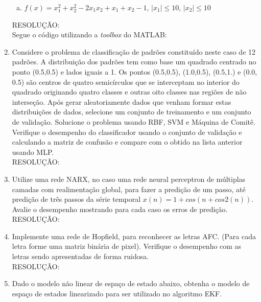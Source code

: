 \documentclass[a4paper,oneside,12pt]{article}
\begin{document}
\begin{enumerate}[1.]
\begin{enumerate}[a)]
\item $f(x) = x_{1}^{2} + x_{2}^{2} - 2 x_{1} x_{2} + x_{1} + x_{2} - 1$, $|x_{1}| \leq 10$, $|x_{2}| \leq 10$
\end{enumerate}

RESOLU\c{C}\~AO: \\

Segue o c\'odigo utilizando a \emph{toolbox} do MATLAB:



\item Considere o problema de classifica\c{c}\~ao de padr\~oes constitu\'ido neste caso de 12 padr\~oes. A distribui\c{c}\~ao dos padr\~oes tem como base um quadrado centrado no ponto (0.5,0.5) e lados iguais a 1. Os pontos (0.5,0.5), (1.0,0.5), (0.5,1.) e (0.0, 0.5) s\~ao centros de quatro semic\'irculos que se interceptam no interior do quadrado originando quatro classes e outras oito classes nas regi\~oes de n\~ao interse\c{c}\~ao. Ap\'os gerar aleatoriamente dados que venham formar estas distribui\c{c}\~oes de dados, selecione um conjunto de treinamento e um conjunto de valida\c{c}\~ao. Solucione o problema usando RBF, SVM e M\'aquina de Comit\^e. Verifique o desempenho do classificador usando o conjunto de valida\c{c}\~ao e calculando a matriz de confus\~ao e compare com o obtido na lista anterior usando MLP. \\

RESOLU\c{C}\~AO: \\

\item Utilize uma rede NARX, no caso uma rede neural perceptron de m\'ultiplas camadas com realimenta\c{c}\~ao global, para fazer a predi\c{c}\~ao de um passo, at\'e predi\c{c}\~ao de tr\^es passos da s\'erie temporal $x(n) = 1 + cos(n + cos 2 (n))$. Avalie o desempenho mostrando para cada caso os erros de predi\c{c}\~ao. \\

RESOLU\c{C}\~AO: \\

\item Implemente uma rede de Hopfield, para reconhecer as letras AFC. (Para cada letra forme uma matriz bin\'aria de pixel). Verifique o desempenho com as letras sendo apresentadas de forma ruidosa. \\

RESOLU\c{C}\~AO: \\

\item Dado o modelo n\~ao linear de espa\c{c}o de estado abaixo, obtenha o modelo de espa\c{c}o de estados linearizado para ser utilizado no algoritmo EKF. \\


\end{enumerate}
\end{document}
